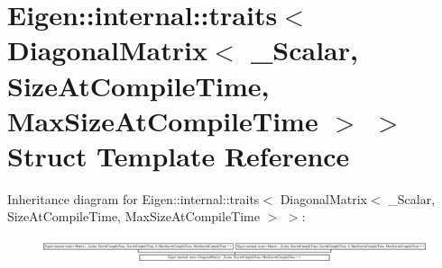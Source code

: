 \hypertarget{struct_eigen_1_1internal_1_1traits_3_01_diagonal_matrix_3_01___scalar_00_01_size_at_compile_timeb0b2868b66e3b20cd28c00acb4409967}{}\section{Eigen\+:\+:internal\+:\+:traits$<$ Diagonal\+Matrix$<$ \+\_\+\+Scalar, Size\+At\+Compile\+Time, Max\+Size\+At\+Compile\+Time $>$ $>$ Struct Template Reference}
\label{struct_eigen_1_1internal_1_1traits_3_01_diagonal_matrix_3_01___scalar_00_01_size_at_compile_timeb0b2868b66e3b20cd28c00acb4409967}
Inheritance diagram for Eigen\+:\+:internal\+:\+:traits$<$ Diagonal\+Matrix$<$ \+\_\+\+Scalar, Size\+At\+Compile\+Time, Max\+Size\+At\+Compile\+Time $>$ $>$\+:\begin{figure}[H]
\begin{center}
\leavevmode
\includegraphics[height=0.710660cm]{struct_eigen_1_1internal_1_1traits_3_01_diagonal_matrix_3_01___scalar_00_01_size_at_compile_timeb0b2868b66e3b20cd28c00acb4409967}
\end{center}
\end{figure}

